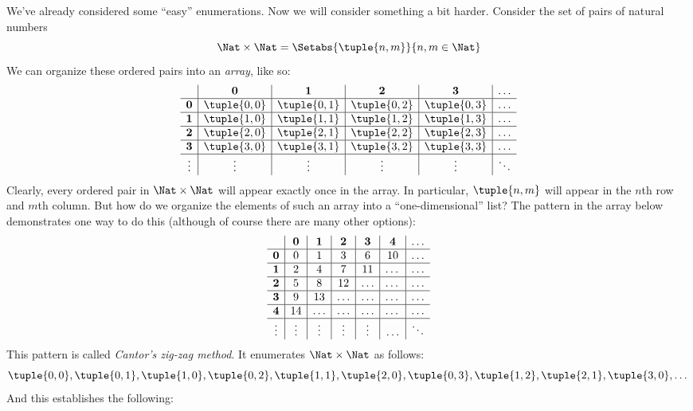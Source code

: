 \documentclass[../../../include/open-logic-section]{subfiles}
\begin{document}


\begin{explain}
We've already considered some ``easy'' enumerations. Now we will
consider something a bit harder. Consider the set of pairs of natural
numbers
\[
\Nat \times \Nat = \Setabs{\tuple{n,m}}{n,m \in \Nat}
\]
We can organize these ordered pairs into an \emph{array}, like so:
\[
\begin{array}{ c | c | c | c | c | c}
& \mathbf 0 & \mathbf 1 & \mathbf 2 & \mathbf 3 & \dots \\
\hline
\mathbf 0 & \tuple{0,0} & \tuple{0,1} & \tuple{0,2} & \tuple{0,3} & \dots \\
\hline
\mathbf 1 & \tuple{1,0} & \tuple{1,1} & \tuple{1,2} & \tuple{1,3} & \dots \\
\hline
\mathbf 2 & \tuple{2,0} & \tuple{2,1} & \tuple{2,2} & \tuple{2,3} & \dots \\
\hline
\mathbf 3 & \tuple{3,0} & \tuple{3,1} & \tuple{3,2} & \tuple{3,3} & \dots \\
\hline
\vdots & \vdots & \vdots & \vdots & \vdots & \ddots\\
\end{array}
\]
Clearly, every ordered pair in $\Nat \times \Nat$ will appear
exactly once in the array. In particular, $\tuple{n,m}$ will appear in
the $n$th row and $m$th column. But how do we organize the elements of
such an array into a ``one-dimensional'' list? The pattern in the array below
demonstrates one way to do this (although of course there are many other options):
\[
\begin{array}{ c | c | c | c | c | c | c}
& \mathbf 0 & \mathbf 1 & \mathbf 2 & \mathbf 3 & \mathbf 4 &\dots \\
\hline
\mathbf 0 & 0  & 1& 3 & 6& 10 &\ldots \\
\hline
\mathbf 1 &2 & 4& 7 & 11 & \dots &\ldots \\
\hline
\mathbf 2 & 5 & 8 & 12 & \ldots & \dots&\ldots \\
\hline
\mathbf 3 & 9 & 13 & \ldots & \ldots & \dots & \ldots \\
\hline
\mathbf 4 & 14 & \ldots & \ldots & \ldots & \dots & \ldots \\
\hline
\vdots & \vdots & \vdots & \vdots & \vdots&\ldots & \ddots\\
\end{array}
\]\noindent
This pattern is called \emph{Cantor's zig-zag method}. It  enumerates
$\Nat \times \Nat$ as follows:
\[
\tuple{0,0}, \tuple{0,1}, \tuple{1,0}, \tuple{0,2}, \tuple{1,1},
\tuple{2,0}, \tuple{0,3}, \tuple{1,2}, \tuple{2,1}, \tuple{3,0}, \dots
\]
And this establishes the following:
\end{explain}
\end{document}
